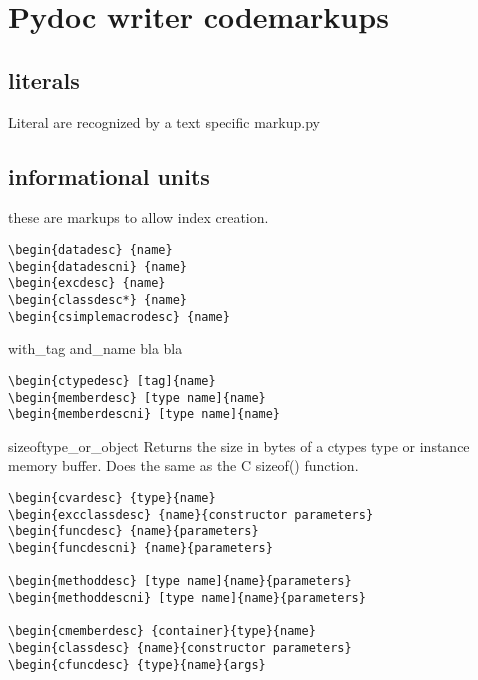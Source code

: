 \ifx\locallinewidth\undefined\newlength{\locallinewidth}\fi
\setlength{\locallinewidth}{\linewidth}


\section{Pydoc writer codemarkups\label{-pydoc-writer-codemarkups}}


\subsection{literals\label{-literals}}

Literal are recognized by a text specific markup.py


\subsection{informational units\label{-informational-units}}

these are markups to allow index creation.
\begin{verbatim}
\begin{datadesc} {name}
\begin{datadescni} {name}
\begin{excdesc} {name}
\begin{classdesc*} {name}
\begin{csimplemacrodesc} {name}
\end{verbatim}

\begin{ctypedesc}[ctype]{with_tag and_name}
bla bla
\end{ctypedesc}
\begin{verbatim}
\begin{ctypedesc} [tag]{name}
\begin{memberdesc} [type name]{name}
\begin{memberdescni} [type name]{name}
\end{verbatim}

\begin{funcdesc}{sizeof}{type_or_object}
Returns the size in bytes of a ctypes type or instance memory
buffer.  Does the same as the C sizeof() function.
\end{funcdesc}
\begin{verbatim}
\begin{cvardesc} {type}{name}
\begin{excclassdesc} {name}{constructor parameters}
\begin{funcdesc} {name}{parameters}
\begin{funcdescni} {name}{parameters}

\begin{methoddesc} [type name]{name}{parameters}
\begin{methoddescni} [type name]{name}{parameters}

\begin{cmemberdesc} {container}{type}{name}
\begin{classdesc} {name}{constructor parameters}
\begin{cfuncdesc} {type}{name}{args}
\end{verbatim}



